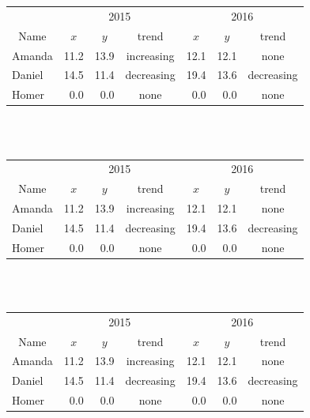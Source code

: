 \documentclass[a4paper,10pt]{article}
\begin{document}
\ \\
\ \\

\begin{center}
\begin{tabular}{l | r r c | r r c } \hline
  \multicolumn{1}{c}{}& \multicolumn{3}{c}{2015} & \multicolumn{3}{c}{2016} \\
  \multicolumn{1}{c}{Name}
  & \multicolumn{1}{c}{$x$} & \multicolumn{1}{c}{$y$} & \multicolumn{1}{c}{trend}
  & \multicolumn{1}{c}{$x$} & \multicolumn{1}{c}{$y$} & \multicolumn{1}{c}{trend} \\
  \hline
  Amanda  & 11.2 & 13.9 & increasing & 12.1 & 12.1 & none \\
  Daniel  & 14.5 & 11.4 & decreasing & 19.4 & 13.6 & decreasing \\
  Homer   &  0.0 &  0.0 & none       &  0.0 &  0.0 & none \\
\hline
\end{tabular}
\end{center}


\ \\
\ \\

\begin{center}
\begin{tabular}{l | r r c | r r c } \toprule[0.2pt]
  \multicolumn{1}{c}{}& \multicolumn{3}{c}{2015} & \multicolumn{3}{c}{2016} \\
  \multicolumn{1}{c}{Name}
  & \multicolumn{1}{c}{$x$} & \multicolumn{1}{c}{$y$} & \multicolumn{1}{c}{trend}
  & \multicolumn{1}{c}{$x$} & \multicolumn{1}{c}{$y$} & \multicolumn{1}{c}{trend} \\
  \midrule[2pt]
  Amanda  & 11.2 & 13.9 & increasing & 12.1 & 12.1 & none \\
  Daniel  & 14.5 & 11.4 & decreasing & 19.4 & 13.6 & decreasing \\
  Homer   &  0.0 &  0.0 & none       &  0.0 &  0.0 & none \\
\bottomrule[0.2pt]
\end{tabular}
\end{center}


\ \\
\ \\


\begin{center}
\begin{tabular}{l  r r c  r r c }
  & \multicolumn{3}{c}{2015} & \multicolumn{3}{c}{2016} \\
  \multicolumn{1}{c}{Name}
  & \multicolumn{1}{c}{$x$} & \multicolumn{1}{c}{$y$} & trend
  & \multicolumn{1}{c}{$x$} & \multicolumn{1}{c}{$y$} & trend \\
  \cmidrule[1.2pt](r){1-1} \cmidrule[1.2pt](lr){2-4} \cmidrule[1.2pt](l){5-7}
  Amanda  & 11.2 & 13.9 & increasing & 12.1 & 12.1 & none \\
  Daniel  & 14.5 & 11.4 & decreasing & 19.4 & 13.6 & decreasing \\
  Homer   &  0.0 &  0.0 & none       &  0.0 &  0.0 & none \\
\bottomrule[0.2pt]
\end{tabular}
\end{center}
\end{document}
